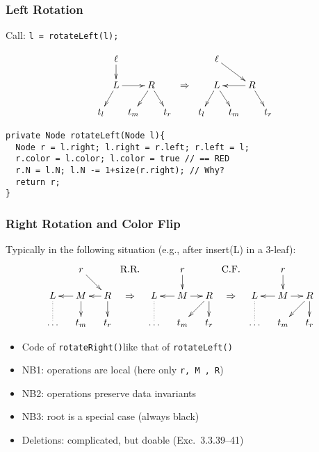 \documentclass[handout]{beamer}
\begin{document}
\begin{frame}[fragile]
    \frametitle{Left Rotation}
Call: {\tt l = rotateLeft(l); }

\[\xymatrix@R=.5cm@C=.1cm{
&&\ell \ar@{>}[d]&&&&&& \ell \ar@{>}[rrd]\\
&&L\ar@{>}[dl]\ar@{>}@[red][rr]&&\ar@{>}[ld]R\ar@{>}[rd]&&\Rightarrow
&&L\ar@{>}[dl]\ar@{>}[rd]&&\ar@{>}@[red][ll]R\ar@{>}[rd]&\\
& t_l&&t_m&&t_r
&& t_l&&t_m&&t_r \\}
\]
\begin{verbatim}
private Node rotateLeft(Node l){
  Node r = l.right; l.right = r.left; r.left = l;
  r.color = l.color; l.color = true // == RED 
  r.N = l.N; l.N -= 1+size(r.right); // Why?
  return r;
}
\end{verbatim}
\end{frame}

\begin{frame}[fragile]
    \frametitle{Right Rotation and Color Flip}
Typically in the following situation (e.g., after insert(L) in a 3-leaf):
\[\xymatrix@R=.5cm@C=.1cm{
&&r \ar@{>}[rrd]&&&\mbox{R.R.}&&& r \ar@{>}[d]&&&\mbox{C.F.}&&& r \ar@{>}@[red][d]\\
\ar@{.}[d]L&&\ar@{>}@[red][ll]\ar@{>}[d]M&&\ar@{>}@[red][ll]R\ar@{>}[d]&\Rightarrow&
L\ar@{.}[d]&&\ar@{>}@[red][ll]M\ar@{>}@[red][rr]&&\ar@{>}[lld]R\ar@{>}[d]&\Rightarrow&
L\ar@{.}[d]&&\ar@{>}[ll]M\ar@{>}[rr]&&\ar@{>}[lld]R\ar@{>}[d]\\
\ldots&&t_m&&t_r&&
\ldots&&t_m&&t_r &&
\ldots&&t_m&&t_r
}
\]
\begin{itemize}[<+->]
\item Code of {\tt rotateRight()}like that of {\tt rotateLeft()}
\item NB1: operations are local (here only {\tt r, M , R})
\item NB2: operations preserve data invariants
\item NB3: root is a special case (always black)
\item Deletions: complicated, but doable (Exc.\ 3.3.39--41)
\end{itemize}     
\end{frame}
\end{document}
